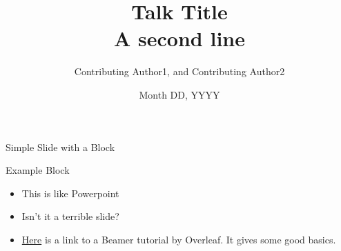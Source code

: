 \documentclass[aspectratio=169]{beamer}
\title{Talk Title\\A second line}
\author{Contributing Author1, and Contributing Author2}
\institute{Brigham Young University}
\date{Month DD, YYYY}
\begin{document}
\begin{frame}[plain]
  \titlepage
\end{frame}

\begin{frame}[c]{Simple Slide with a Block}


  \centering
  \vspace{-0.5\baselineskip}
  \begin{block}{Example Block}
    \begin{itemize} 
    \item This is like Powerpoint
    \item Isn't it a terrible slide?
    \item \href{https://www.overleaf.com/learn/latex/Beamer\_Presentations\%3A\_A\_Tutorial\_for\_Beginners\_(Part\_1)\%E2\%80\%94Getting\_Started}{Here} is a link to a Beamer tutorial by Overleaf. 
It gives some good basics.
  \end{itemize}
  \end{block}

\end{frame}
\end{document}
